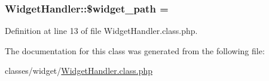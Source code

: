 \subsubsection[{\$widget\+\_\+path}]{\setlength{\rightskip}{0pt plus 5cm}Widget\+Handler\+::\$widget\+\_\+path = \textquotesingle{}\textquotesingle{}}\label{classWidgetHandler_a153b7e8baf0e97c152eb6d4dfae17e9d}


Definition at line 13 of file Widget\+Handler.\+class.\+php.



The documentation for this class was generated from the following file\+:\begin{DoxyCompactItemize}
\item 
classes/widget/\hyperlink{WidgetHandler_8class_8php}{Widget\+Handler.\+class.\+php}\end{DoxyCompactItemize}
